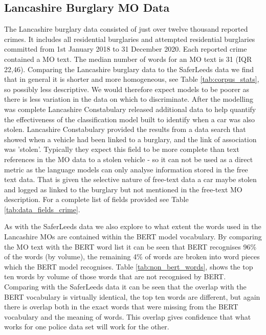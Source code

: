 \subsection{Lancashire Burglary MO Data} The Lancashire burglary data consisted of just over twelve thousand reported crimes. It includes all residential burglaries and attempted residential burglaries committed from 1st January 2018 to 31 December 2020. Each reported crime contained a MO text. The median number of words for an MO text is 31 (IQR 22,46). Comparing the Lancashire burglary data to the SaferLeeds data we find that in general it is shorter and more homogeneous, see Table \ref{tab:corpus_stats}, so possibly less descriptive. We would therefore expect models to be poorer as there is less variation in the data on which to discriminate. After the modelling was complete Lancashire Constabulary released additional data to help quantify the effectiveness of the classification model built to identify when a car was also stolen. Lancashire Constabulary provided the results from a data search that showed when a vehicle had been linked to a burglary, and the link of association was 'stolen'. Typically they expect this field to be more complete than text references in the MO data to a stolen vehicle - so it can not be used as a direct metric as the language models can only analyse information stored in the free text data. That is given the selective nature of free-text data a car maybe stolen and logged as linked to the burglary but not mentioned in the free-text MO description. For a complete list of fields provided see Table \ref{tab:data_fields_crime}.

As with the SaferLeeds data we also explore to what extent the words used in the Lancashire MOs are contained within the BERT model vocabulary. By comparing the MO text with the BERT word list it can be seen that BERT recognises 96\% of the words (by volume), the remaining 4\% of words are broken into word pieces which the BERT model recognises. Table \ref{tab:non_bert_words}, shows the top ten words by volume of those words that are not recognised by BERT. Comparing with the SaferLeeds data it can be seen that the overlap with the BERT vocabulary is virtually identical, the top ten words are different, but again there is overlap both in the exact words that were missing from the BERT vocabulary and the meaning of words. This overlap gives confidence that what works for one police data set will work for the other. 

